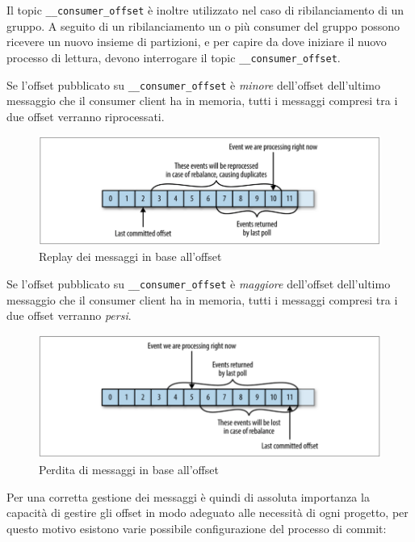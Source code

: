 \documentclass[]{article}
\begin{document}
Il topic \texttt{\_\_consumer\_offset} è inoltre utilizzato nel caso di
ribilanciamento di un gruppo. A seguito di un ribilanciamento un o più
consumer del gruppo possono ricevere un nuovo insieme di partizioni, e
per capire da dove iniziare il nuovo processo di lettura, devono
interrogare il topic \texttt{\_\_consumer\_offset}.

Se l'offset pubblicato su \texttt{\_\_consumer\_offset} è \emph{minore}
dell'offset dell'ultimo messaggio che il consumer client ha in memoria,
tutti i messaggi compresi tra i due offset verranno riprocessati.

\begin{figure}
\centering
\includegraphics[width=1.00000\textwidth]{../images/early-offset.png}
\caption{Replay dei messaggi in base all'offset \label{figure_3}}
\end{figure}

Se l'offset pubblicato su \texttt{\_\_consumer\_offset} è
\emph{maggiore} dell'offset dell'ultimo messaggio che il consumer client
ha in memoria, tutti i messaggi compresi tra i due offset verranno
\emph{persi}.

\begin{figure}
\centering
\includegraphics[width=1.00000\textwidth]{../images/late-offset.png}
\caption{Perdita di messaggi in base all'offset \label{figure_3}}
\end{figure}

Per una corretta gestione dei messaggi è quindi di assoluta importanza
la capacità di gestire gli offset in modo adeguato alle necessità di
ogni progetto, per questo motivo esistono varie possibile configurazione
del processo di commit:
\end{document}
